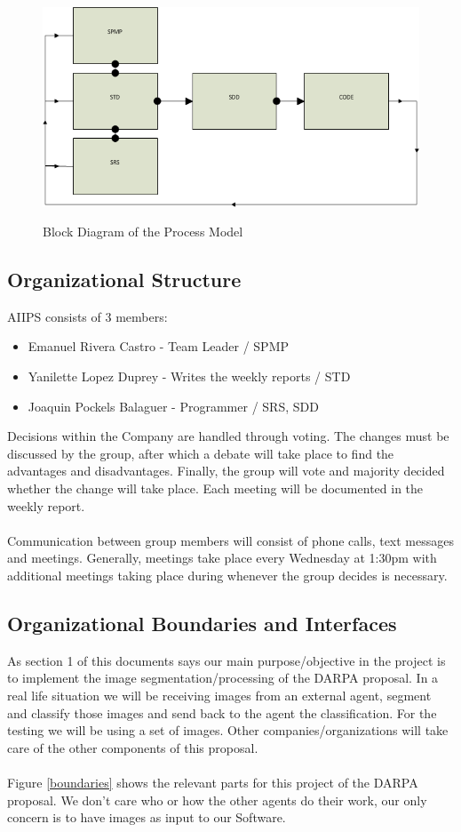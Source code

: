 \documentclass[12pt]{article}
\begin{document}
\begin{figure}[H]\centering
  \includegraphics[width=6.0in]{block_diagram_Org_Struct}\\
  \caption{Block Diagram of the Process Model}\label{org_struct}
  \end{figure}

\subsection{Organizational Structure}
AIIPS consists of 3 members:
\begin{itemize}
  \item Emanuel Rivera Castro - Team Leader / SPMP
  \item Yanilette Lopez Duprey - Writes the weekly reports / STD
  \item Joaquin Pockels Balaguer - Programmer / SRS, SDD
\end{itemize}

Decisions within the Company are handled through voting. The changes must be discussed by the group, after which a debate will take place to find the advantages and disadvantages. Finally, the group will vote and majority decided whether the change will take place. Each meeting will be documented in the weekly report.\\\\
Communication between group members will consist of phone calls, text messages and meetings. Generally, meetings take place every Wednesday at 1:30pm with additional meetings taking place during whenever the group decides is necessary.

\subsection{Organizational Boundaries and Interfaces}
As section 1 of this documents says our main purpose/objective in the project is to implement the image segmentation/processing of the DARPA proposal. In a real life situation we will be receiving images from an external agent, segment and classify those images and send back to the agent the classification. For the testing we will be using a set of images. Other companies/organizations will take care of the other components of this proposal.\\\\
Figure \ref{boundaries} shows the relevant parts for this project of the DARPA proposal. We don't care who or how the other agents do their work, our only concern is to have images as input to our Software.
\end{document}
